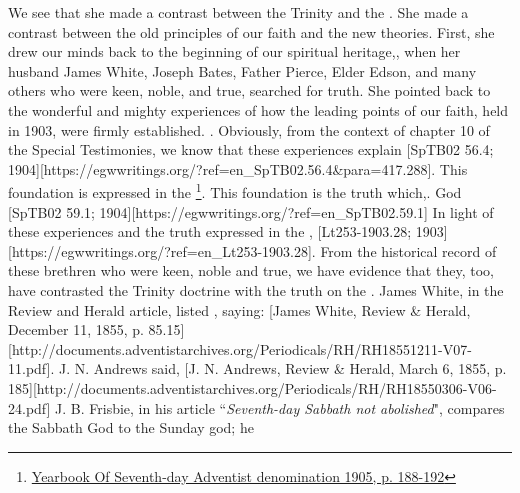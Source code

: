 We see that she made a contrast between the Trinity and the . She made a contrast between the old principles of our faith and the new theories. First, she drew our minds back to the beginning of our spiritual heritage,, when her husband James White, Joseph Bates, Father Pierce, Elder Edson, and many others who were keen, noble, and true, searched for truth. She pointed back to the wonderful and mighty experiences of how the leading points of our faith, held in 1903, were firmly established.   . Obviously, from the context of chapter 10 of the Special Testimonies, we know that these experiences explain [SpTB02 56.4; 1904][https://egwwritings.org/?ref=en\_SpTB02.56.4\&para=417.288]. This foundation is expressed in the \footnote{\href{https://static1.squarespace.com/static/554c4998e4b04e89ea0c4073/t/59d17e24c027d84167e17617/1506901547915/SDA-YB1905+\%28P.+188-192\%29.pdf}{Yearbook Of Seventh-day Adventist denomination 1905, p. 188-192}}. This foundation is the truth which,. God [SpTB02 59.1; 1904][https://egwwritings.org/?ref=en\_SpTB02.59.1] In light of these experiences and the truth expressed in the , [Lt253-1903.28; 1903][https://egwwritings.org/?ref=en\_Lt253-1903.28]. From the historical record of these brethren who were keen, noble and true, we have evidence that they, too, have contrasted the Trinity doctrine with the truth on the . James White, in the Review and Herald article, listed , saying: [James White, Review \& Herald, December 11, 1855, p. 85.15][http://documents.adventistarchives.org/Periodicals/RH/RH18551211-V07-11.pdf]. J. N. Andrews said, [J. N. Andrews, Review \& Herald, March 6, 1855, p. 185][http://documents.adventistarchives.org/Periodicals/RH/RH18550306-V06-24.pdf] J. B. Frisbie, in his article “\textit{Seventh-day Sabbath not abolished}", compares the Sabbath God to the Sunday god; he 